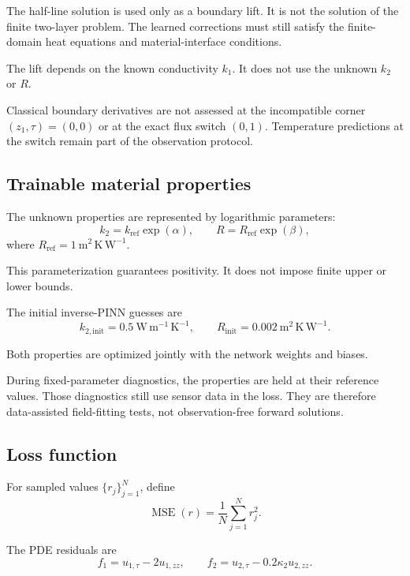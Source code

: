 \documentclass[11pt,a4paper]{article}
\newcommand{\MSE}{\operatorname{MSE}}
\begin{document}
The half-line solution is used only as a boundary lift.
It is not the solution of the finite two-layer problem.
The learned corrections must still satisfy the finite-domain
heat equations and material-interface conditions.

The lift depends on the known conductivity $k_1$.
It does not use the unknown $k_2$ or $R$.

Classical boundary derivatives are not assessed at the
incompatible corner $(z_1,\tau)=(0,0)$ or at the exact flux
switch $(0,1)$. Temperature predictions at the switch remain
part of the observation protocol.

\subsection{Trainable material properties}

The unknown properties are represented by logarithmic
parameters:
\begin{equation}
k_2=k_{\mathrm{ref}}\exp(\alpha),
\qquad
R=R_{\mathrm{ref}}\exp(\beta),
\label{eq:logparameters}
\end{equation}
where
$R_{\mathrm{ref}}=1~\mathrm{m^2\,K\,W^{-1}}$.

This parameterization guarantees positivity.
It does not impose finite upper or lower bounds.

The initial inverse-PINN guesses are
\begin{equation}
k_{2,\mathrm{init}}
=
0.5~\mathrm{W\,m^{-1}\,K^{-1}},
\qquad
R_{\mathrm{init}}
=
0.002~\mathrm{m^2\,K\,W^{-1}}.
\end{equation}

Both properties are optimized jointly with the network
weights and biases.

During fixed-parameter diagnostics, the properties are held
at their reference values.
Those diagnostics still use sensor data in the loss.
They are therefore data-assisted field-fitting tests,
not observation-free forward solutions.

\subsection{Loss function}

For sampled values $\{r_j\}_{j=1}^{N}$, define
\begin{equation}
\MSE(r)=\frac{1}{N}\sum_{j=1}^{N}r_j^2.
\end{equation}

The PDE residuals are
\begin{equation}
f_1=u_{1,\tau}-2u_{1,zz},
\qquad
f_2=u_{2,\tau}-0.2\kappa_2u_{2,zz}.
\end{equation}
\end{document}
